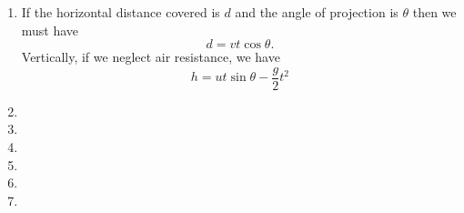 \documentclass{article}
\begin{document}
\begin{enumerate}
    For the second integral, consider the substitution \(u=\sqrt{1+\sin x}\). Then \(du = \frac{\cos x}{2\sqrt{1+\sin x}} dx\) and \(u^2-1=\sin x\). Then we have
    \begin{align*}
        &\int\frac{2}{u^2-1}du \\
        =&\int \frac{1}{u-1} - \frac{1}{u+1} du \\
        = &\ln|u-1| - \ln|u+1| + c \\
        = &\ln\Big|\frac{u-1}{u+1}\Big| + c \\
        = &\ln \Big| \frac{u^2-2u+1}{u^2-1} \Big| + c \\
        = &\ln \Big| \frac{\sin x + 2 -2\sqrt{1+\sin x}}{\sin x} \Big|+ c
    \end{align*}
    \item If the horizontal distance covered is \(d\) and the angle of projection is \(\theta\) then we must have
    \[
    d=vt\cos \theta.
    \]
    Vertically, if we neglect air resistance, we have
    \[
    h=ut\sin \theta-\frac{g}{2}t^2
    \]
    \item 
    \item 
    \item 
    \item 
    \item 
    \item 
\end{enumerate}
\end{document}

